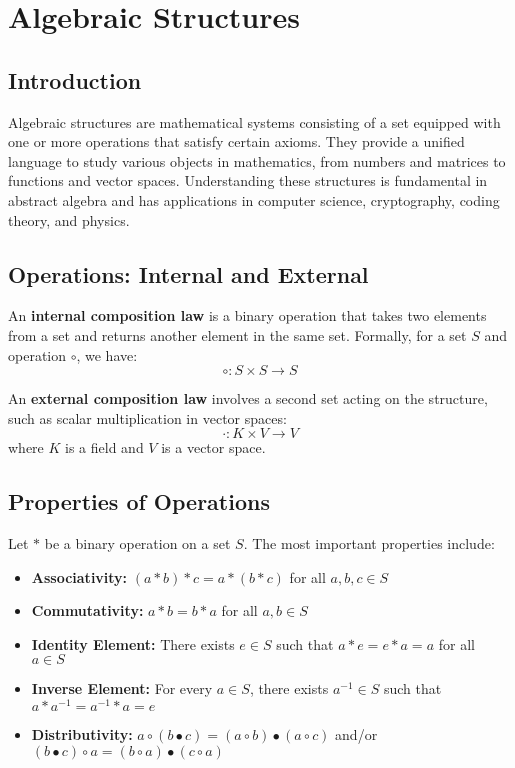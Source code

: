 \section{Algebraic Structures}

\subsection{Introduction}

Algebraic structures are mathematical systems consisting of a set equipped with one or more operations that satisfy certain axioms. They provide a unified language to study various objects in mathematics, from numbers and matrices to functions and vector spaces. Understanding these structures is fundamental in abstract algebra and has applications in computer science, cryptography, coding theory, and physics.

\subsection{Operations: Internal and External}

An \textbf{internal composition law} is a binary operation that takes two elements from a set and returns another element in the same set. Formally, for a set \(S\) and operation \(\circ\), we have:
\[
\circ: S \times S \rightarrow S
\]

An \textbf{external composition law} involves a second set acting on the structure, such as scalar multiplication in vector spaces:
\[
\cdot: K \times V \rightarrow V
\]
where \(K\) is a field and \(V\) is a vector space.

\subsection{Properties of Operations}

Let \(\ast\) be a binary operation on a set \(S\). The most important properties include:

\begin{itemize}[label=\(-\)]
    \item \textbf{Associativity:} \((a \ast b) \ast c = a \ast (b \ast c)\) for all \(a,b,c \in S\)
    \item \textbf{Commutativity:} \(a \ast b = b \ast a\) for all \(a,b \in S\)
    \item \textbf{Identity Element:} There exists \(e \in S\) such that \(a \ast e = e \ast a = a\) for all \(a \in S\)
    \item \textbf{Inverse Element:} For every \(a \in S\), there exists \(a^{-1} \in S\) such that \(a \ast a^{-1} = a^{-1} \ast a = e\)
    \item \textbf{Distributivity:} \(a \circ (b \bullet c) = (a \circ b) \bullet (a \circ c)\) and/or \((b \bullet c) \circ a = (b \circ a) \bullet (c \circ a)\)
\end{itemize}

